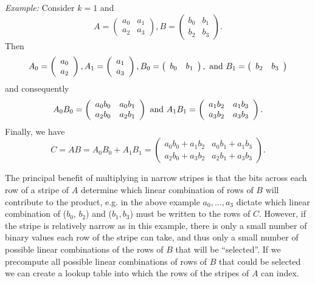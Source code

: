 \emph{Example:} Consider $k=1$ and
\[
A = \left(\begin{array}{rr}
a_{0} & a_{1} \\
a_{2} & a_{3}
\end{array}\right), B = \left(\begin{array}{rr}
b_{0} & b_{1} \\
b_{2} & b_{3}
\end{array}\right).
\]
Then \[
A_0 = \left(\begin{array}{r}
a_{0} \\
a_{2}
\end{array}\right), A_1 = 
\left(\begin{array}{r}
a_{1} \\
a_{3}
\end{array}\right), B_0 = \left(\begin{array}{rr}
b_{0} & b_{1}
\end{array}\right), \textnormal{ and } B_1 = 
\left(\begin{array}{rr}
b_{2} & b_{3}
\end{array}\right)
\] and consequently
\[
A_0 B_0 = \left(\begin{array}{rr}
a_{0} b_{0} & a_{0} b_{1} \\
a_{2} b_{0} & a_{2} b_{1}
\end{array}\right) \textnormal{ and } A_1 B_1 = \left(\begin{array}{rr}
a_{1} b_{2} & a_{1} b_{3} \\
a_{3} b_{2} & a_{3} b_{3}
\end{array}\right).
\] Finally, we have
\[
C = AB = A_0B_0 + A_1B_1 = \left(\begin{array}{rr}
a_{0} b_{0} + a_{1} b_{2} & a_{0} b_{1} + a_{1} b_{3} \\
a_{2} b_{0} + a_{3} b_{2} & a_{2} b_{1} + a_{3} b_{3}
\end{array}\right).
\]
\vspace{0.2cm}

The principal benefit of multiplying in narrow stripes is that the bits across each row of a stripe of $A$ determine which linear combination of rows of $B$ will contribute to the product, e.g. in the above example $a_0, \dots , a_3$ dictate which linear combination of ($b_0$, $b_2$) and ($b_1, b_3$) must be written to the rows of $C$. However, if the stripe is relatively narrow as in this example, there is only a small  number of binary values each row of the stripe can take, and thus only a small number of possible linear combinations of the rows of $B$ that will be ``selected''. If we precompute all possible linear combinations of rows of $B$ that could be selected we can create a lookup table into which the rows of the stripes of $A$ can index.

